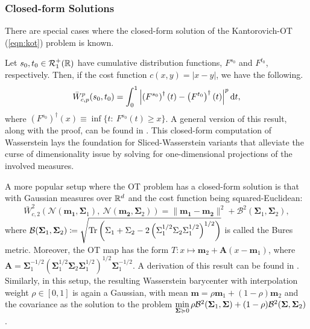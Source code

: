 \subsubsection{Closed-form Solutions}
There are special cases where the closed-form solution of the Kantorovich-OT (\ref{eqn:kot}) problem is known. 

\noindent Let $s_0, t_0\in \mathcal{R}_1^+(\mathbb{R})$ have cumulative distribution functions, $F^{s_0}$ and $F^{t_0}$, respectively. Then, if the cost function $c(x, y) = |x-y|$, we have the following.
\begin{align}\nonumber
    \bar{W}^p_{c, p}(s_0, t_0) = \int_0^1 \left| \left(F^{s_0}\right)^{\dagger}(t) - \left(F^{t_0}\right)^{\dagger}(t) \right|^p \textup{d}t,
\end{align}
where $\left(F^{s_0}\right)^{\dagger}(x)\equiv \inf\{t: \ F^{s_0}(t)\geq x\}$.
A general version of this result, along with the proof, can be found in \citet[Proposition (2.17)]{santab}. This closed-form computation of Wasserstein lays the foundation for Sliced-Wasserstein variants \citep{bonet2023leveraging} that alleviate the curse of dimensionality issue by solving for one-dimensional projections of the involved measures.

A more popular setup where the OT problem has a closed-form solution is that with Gaussian measures over $\mathbb{R}^d$ and the cost function being squared-Euclidean:
$$\bar{W}_{c, 2}^2\left(\mathcal{N}(\mathbf{m_1}, \bm{\Sigma}_1),\ \mathcal{N}(\mathbf{m_2}, \bm{\Sigma}_2)\right) = \|\mathbf{m_1}-\mathbf{m_2}\|^2 + \mathcal{B}^2(\bm{\Sigma}_1, \bm{\Sigma}_2),$$ where $\mathcal{B}(\bm{\Sigma}_1, \bm{\Sigma}_2)\coloneqq \sqrt{\rm{Tr}\left(\bm{\Sigma}_1+\bm{\Sigma}_2-2\left(\bm{\Sigma}^{1/2}_1\bm{\Sigma}_2\bm{\Sigma}^{1/2}_1\right)^{1/2} \right)}$ is called the Bures metric.
Moreover, the OT map has the form $T: x\mapsto \mathbf{m}_2+ \mathbf{A}(x-\mathbf{m}_1)$, where $\mathbf{A}=\bm{\Sigma}_1^{-1/2}\left(\bm{\Sigma}_1^{1/2}\bm{\Sigma}_2\bm{\Sigma}_1^{1/2} \right)^{1/2}\bm{\Sigma}_1^{-1/2}$.
A derivation of this result can be found in \citet[Example (1.19)]{Chewi2024StatisticalOT}.
Similarly, in this setup, the resulting Wasserstein barycenter with interpolation weight $\rho\in [0, 1]$ is again a Gaussian, with mean $\mathbf{m}=\rho \mathbf{m}_1+(1-\rho)\mathbf{m}_2$ and the covariance as the solution to the problem $\min\limits_{\bm{\Sigma}\succcurlyeq 0}\rho \mathcal{B}^2(\bm{\Sigma}_1, \bm{\Sigma})+(1-\rho)\mathcal{B}^2(\bm{\Sigma}, \bm{\Sigma}_2)$ \citep[Remark (9.5)]{peyre2019computational}.

